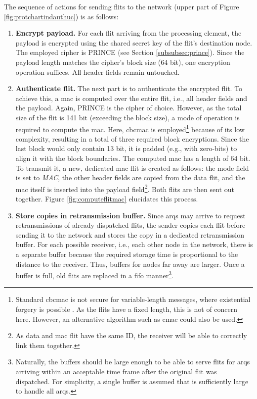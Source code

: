 The sequence of actions for sending flits to the network (upper part of Figure \ref{fig:protchartindauthuc}) is as follows:
\begin{enumerate}
    \item \textbf{Encrypt payload.} For each flit arriving from the processing element, the payload is encrypted using the shared secret key of the
        flit's destination node. The employed cipher is PRINCE (see Section \ref{subsubsec:prince}). Since the payload length matches the cipher's
        block size (64 bit), one encryption operation suffices. All header fields remain untouched.
    \item \textbf{Authenticate flit.} The next part is to authenticate the encrypted flit. To achieve this, a \gls{mac} is computed over the entire
        flit, i.e., all header fields and the payload. Again, PRINCE is the cipher of choice. However, as the total size of the flit is 141 bit
        (exceeding the block size), a mode of operation is required to compute the \gls{mac}. Here, \gls{cbcmac} is employed\footnote{Standard
        \gls{cbcmac} is not secure for variable-length messages, where existential forgery is possible \cite{wikilengthextattack}. As the flits have a
        fixed length, this is not of concern here. However, an alternative algorithm such as \gls{cmac} could also be used.} because of its low
        complexity, resulting in a total of three required block encryptions. Since the last block would only contain 13 bit, it is
        padded (e.g., with zero-bits) to align it with the block boundaries. The computed \gls{mac} has a length of 64 bit. To transmit it, a new, dedicated
        \gls{mac} flit is created as follows: the mode field is set to \textit{MAC}, the other header fields are copied from the data flit, and the
        \gls{mac} itself is inserted into the payload field\footnote{As data and \gls{mac} flit have the same ID, the receiver will be able to
        correctly link them together.}. Both flits are then sent out together. Figure \vref{fig:computeflitmac} elucidates this process.
    \item \textbf{Store copies in retransmission buffer.} Since \glspl{arq} may arrive to request retransmissions of already dispatched flits, the
        sender copies each flit before sending it to the network and stores the copy in a dedicated retransmission buffer. For each possible receiver,
        i.e., each other node in the network,
        there is a separate buffer because the required storage time is proportional to the distance to the receiver. Thus, buffers for nodes far away are
        larger. Once a buffer is full, old flits are replaced in a \gls{fifo} manner\footnote{Naturally, the buffers should be large enough to be
        able to serve flits for \glspl{arq} arriving within an acceptable time frame after the original flit was dispatched. For simplicity, a
        single buffer is assumed that is sufficiently large to handle all \glspl{arq}.}.
\end{enumerate}
\vspace{0.5\baselineskip}

